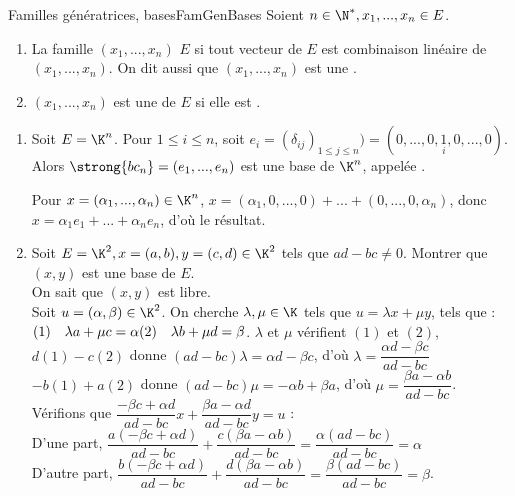 \documentclass[12pt, a4paper]{report}
\begin{document}
\begin{definition}{Familles génératrices, bases}{FamGenBases}
Soient $n \in \N^*, x_1,...,x_n \in E$.
\begin{enumerate}
	\item La famille $(x_1,...,x_n)$  $E$ si tout vecteur de $E$ est combinaison linéaire de $(x_1,...,x_n)$. On dit aussi que $(x_1,...,x_n)$ est une .
	\item $(x_1,...,x_n)$ est une  de $E$ si elle est .
\end{enumerate}
\end{definition}

\begin{exemple}[Exemples]
\begin{enumerate}
	\item Soit $E=\K^n$. Pour $1 \le i \le n$, soit $e_i = (\delta_{ij})_{1 \le j \le n}) = (0,...,0,\underset{i}{1},0,...,0)$. \\
	Alors $\strong{bc_n} = (e_1,...,e_n)$ est une base de $\K^n$, appelée .
	\begin{demo}{}
	Pour $x = (\alpha_1,...,\alpha_n) \in \K^n$, $x = (\alpha_1,0,...,0) + ... + (0,...,0,\alpha_n)$, donc $x= \alpha_1e_1+...+\alpha_ne_n$, d'où le résultat.
	\end{demo}
	
	\item Soit $E=\K^2, x=(a,b), y=(c,d) \in \K^2$ tels que $ad-bc \ne 0$. Montrer que $(x,y)$ est une base de $E$. \\
	On sait que $(x,y)$ est libre. \\
	Soit $u = (\alpha,\beta) \in \K^2$. On cherche $\lambda, \mu \in \K$ tels que $u = \lambda x + \mu y$, \ie tels que : \\
	$(1) \quad \lambda a + \mu c = \alpha \\
	(2) \quad \lambda b + \mu d = \beta$.
	 $\lambda$ et $\mu$ vérifient $(1)$ et $(2)$, \\
	$d(1)-c(2)$ donne $(ad-bc)\lambda = \alpha d - \beta c$, d'où $\lambda = \dfrac{\alpha d - \beta c}{ad-bc}$ \\
	
	$-b(1)+a(2)$ donne $(ad-bc)\mu = -\alpha b + \beta a$, d'où $\mu = \dfrac{\beta a - \alpha b}{ad-bc}$. \\ 
	
	Vérifions que $\dfrac{-\beta c + \alpha d}{ad-bc} x + \dfrac{\beta a- \alpha d}{ad-bc} y = u$ : \\
	
	D'une part, $\dfrac{a(-\beta c+\alpha d)}{ad-bc} + \dfrac{c(\beta a - \alpha b)}{ad-bc} = \dfrac{\alpha(ad-bc)}{ad-bc} = \alpha$ \\
	
	D'autre part, $\dfrac{b(-\beta c+ \alpha d)}{ad-bc} + \dfrac{d(\beta a - \alpha b)}{ad-bc} = \dfrac{\beta(ad-bc)}{ad-bc} = \beta$.
\end{enumerate}
\end{exemple}
\end{document}
